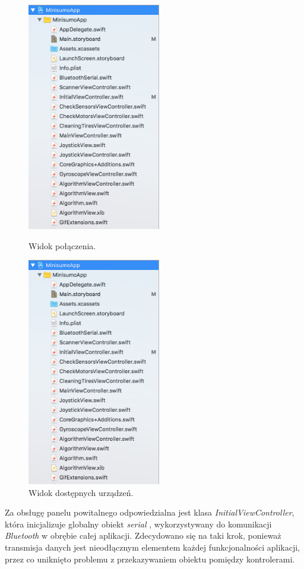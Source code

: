 \begin{figure}[H]
\centering
\begin{minipage}{.5\textwidth}
  \centering
  \includegraphics[width=.75\linewidth, height=10cm, keepaspectratio]{pic05/structure.png}
  \caption{Widok połączenia.}
  \label{fig:initial}
\end{minipage}%
\begin{minipage}{.5\textwidth}
  \centering
  \includegraphics[width=.75\linewidth, height=10cm, keepaspectratio]{pic05/structure.png}
  \caption{Widok dostępnych urządzeń.}
  \label{fig:scanner}
\end{minipage}
\end{figure}

Za obsługę panelu powitalnego odpowiedzialna jest klasa \textit{InitialViewController}, która inicjalizuje globalny obiekt \textit{serial} , wykorzystywany do komunikacji \textit{Bluetooth} w obrębie całej aplikacji. Zdecydowano się na taki krok, ponieważ transmisja danych jest nieodłącznym elementem każdej funkcjonalności aplikacji, przez co uniknięto problemu z przekazywaniem obiektu pomiędzy kontrolerami.

